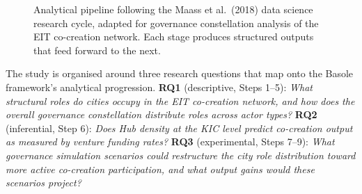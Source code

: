 \documentclass[review,12pt]{elsarticle}
\begin{document}
\begin{figure}[htbp]
\centering
{}
\caption{Analytical pipeline following the Maass et al.\ (2018) data science research cycle, adapted for governance constellation analysis of the EIT co-creation network. Each stage produces structured outputs that feed forward to the next.}
\label{fig:pipeline}
\end{figure}

The study is organised around three research questions that map onto the Basole framework's analytical progression. \textbf{RQ1} (descriptive, Steps 1--5): \emph{What structural roles do cities occupy in the EIT co-creation network, and how does the overall governance constellation distribute roles across actor types?} \textbf{RQ2} (inferential, Step 6): \emph{Does Hub density at the KIC level predict co-creation output as measured by venture funding rates?} \textbf{RQ3} (experimental, Steps 7--9): \emph{What governance simulation scenarios could restructure the city role distribution toward more active co-creation participation, and what output gains would these scenarios project?}
\end{document}
